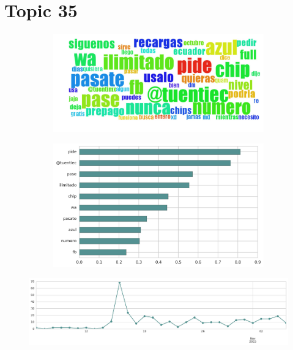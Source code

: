\section{Topic 35}

\begin{figure}[htbp!]
    \centering
    \begin{subfigure}[b]{0.49\textwidth}
        \includegraphics[width=\textwidth]{twitter_all/report_images/topic-35-wordcloud.jpg}
    \end{subfigure}
    \begin{subfigure}[b]{0.49\textwidth}
        \includegraphics[width=\textwidth]{twitter_all/report_images/topic-35-terms.jpg}
    \end{subfigure}
\end{figure}

\begin{figure}[htbp!]
    \centering
    \includegraphics[width=\textwidth]{twitter_all/report_images/topic-35-timeseries.jpg}
\end{figure}

